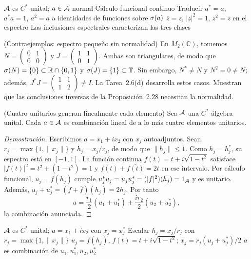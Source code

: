 \proofdiagrambranch
{$\mathcal A$ es $C^*$ unital; $a\in\mathcal A$ normal}
{Cálculo funcional continuo}
{Traducir $a^*=a$, $a^*a=1$, $a^2=a$ a identidades de funciones sobre $\sigma(a)$}
{$\overline z=z$, $|z|^2=1$, $z^2=z$ en el espectro}
{Las inclusiones espectrales caracterizan las tres clases}

\begin{cthejemplo}{(Contraejemplos: espectro pequeño sin normalidad)}
En $M_2(\mathbb C)$, tomemos
$N=\begin{pmatrix}0&1\\0&0\end{pmatrix}$ y
$J=\begin{pmatrix}1&1\\0&1\end{pmatrix}$.
Ambas son triangulares, de modo que
$\sigma(N)=\{0\}\subset\mathbb R\cap\{0,1\}$ y
$\sigma(J)=\{1\}\subset\mathbb T$.
Sin embargo, $N^*\neq N$ y $N^2=0\neq N$;
además, $J^*J=\begin{pmatrix}1&1\\1&2\end{pmatrix}\neq I$.
La Tarea~2.6(d) desarrolla estos casos. Muestran que las conclusiones
inversas de la Proposición~2.28 necesitan la normalidad.
\end{cthejemplo}

\begin{cthproposicion}{(Cuatro unitarios generan linealmente cada elemento)}
Sea $\mathcal A$ una $C^*$-álgebra unital. Cada $a\in\mathcal A$ es combinación lineal de a lo más cuatro elementos
unitarios.
\end{cthproposicion}

\begin{proof}[Demostración]
Escribimos $a=x_1+ix_2$ con $x_j$ autoadjuntos. Sean
$r_j=\max\{1,\|x_j\|\}$ y $h_j=x_j/r_j$, de modo que $\|h_j\|\le1$.
Como $h_j=h_j^*$, su espectro está en $[-1,1]$. La función continua
$f(t)=t+i\sqrt{1-t^2}$ satisface
$|f(t)|^2=t^2+(1-t^2)=1$ y $f(t)+\overline{f(t)}=2t$ en ese intervalo.
Por cálculo funcional, $u_j=f(h_j)$ cumple
$u_j^*u_j=u_ju_j^*=(|f|^2)(h_j)=1_\mathcal A$ y es unitario. Además,
$u_j+u_j^*=(f+\overline f)(h_j)=2h_j$. Por tanto
\[
 a=\frac{r_1}{2}(u_1+u_1^*)+\frac{i r_2}{2}(u_2+u_2^*),
\]
la combinación anunciada.
\end{proof}

\proofdiagram
{$\mathcal A$ es $C^*$ unital; $a=x_1+ix_2$ con $x_j=x_j^*$}
{Escalar $h_j=x_j/r_j$ con $r_j=\max\{1,\|x_j\|\}$}
{$u_j=f(h_j)$, $f(t)=t+i\sqrt{1-t^2}$; $x_j=r_j(u_j+u_j^*)/2$}
{$a$ es combinación de $u_1,u_1^*,u_2,u_2^*$}


